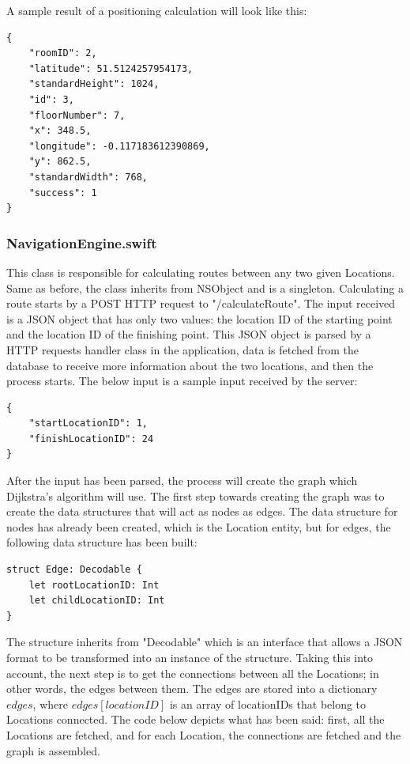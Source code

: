 A sample result of a positioning calculation will look like this:
\begin{lstlisting}
{   
    "roomID": 2, 
    "latitude": 51.5124257954173, 
    "standardHeight": 1024, 
    "id": 3, 
    "floorNumber": 7, 
    "x": 348.5, 
    "longitude": -0.117183612390869, 
    "y": 862.5, 
    "standardWidth": 768, 
    "success": 1
}
\end{lstlisting}

\subsubsection*{NavigationEngine.swift}
This class is responsible for calculating routes between any two given Locations. Same as before, the class inherits from NSObject and is a singleton. Calculating a route starts by a POST HTTP request to "/calculateRoute". The input received is a JSON object that has only two values: the location ID of the starting point and the location ID of the finishing point. This JSON object is parsed by a HTTP requests handler class in the application, data is fetched from the database to receive more information about the two locations, and then the process starts. The below input is a sample input received by the server:

\begin{lstlisting}
{
    "startLocationID": 1,
    "finishLocationID": 24
}
\end{lstlisting}

After the input has been parsed, the process will create the graph which Dijkstra's algorithm will use. The first step towards creating the graph was to create the data structures that will act as nodes as edges. The data structure for nodes has already been created, which is the Location entity, but for edges, the following data structure has been built:

\begin{lstlisting}
struct Edge: Decodable {
    let rootLocationID: Int
    let childLocationID: Int
}
\end{lstlisting}

The structure inherits from "Decodable" which is an interface that allows a JSON format to be transformed into an instance of the structure. Taking this into account, the next step is to get the connections between all the Locations; in other words, the edges between them. The edges are stored into a dictionary $edges$, where $edges[locationID]$ is an array of locationIDs that belong to Locations connected. The code below depicts what has been said: first, all the Locations are fetched, and for each Location, the connections are fetched and the graph is assembled.

